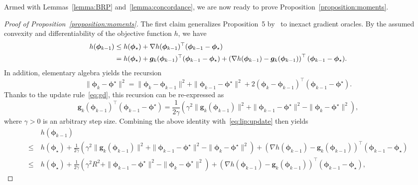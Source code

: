 \documentclass[11pt, a4paper, oneside, reqno]{article}
\begin{document}
	Armed with Lemmas~\ref{lemma:BRP} and~\ref{lemma:concordance}, we are now ready to prove Proposition~\ref{proposition:moments}.
	
	\begin{proof}[Proof of Proposition~\ref{proposition:moments}]
		The first claim generalizes Proposition~5 by~\citet{bach2013adaptivity} to inexact gradient oracles. 
		By the assumed convexity and differentiability of the objective function $h$, we have
		\begin{align} \label{eq:lip:update}
		h(\bm \phi_{k-1}) 
		&\leq h(\bm \phi_{\star}) + \nabla h(\bm \phi_{k-1})^\top (\bm \phi_{k-1} - \bm \phi_{\star}) \\
		&= h(\bm \phi_{\star}) + \bm g_k(\bm \phi_{k-1})^\top (\bm \phi_{k-1} - \bm \phi_{\star}) + \left( \nabla h(\bm \phi_{k-1}) - \bm g_k(\bm \phi_{k-1}) \right)^\top (\bm \phi_{k-1} - \bm \phi_{\star}). \notag
		\end{align}
		In addition, elementary algebra  yields the recursion
		\begin{equation*}
		\| \bm \phi_{k} - \bm \phi^\star \|^2 = \| \bm \phi_{k} - \bm \phi_{k-1} \|^2 + \| \bm \phi_{k-1} - \bm \phi^\star \|^2 + 2 (\bm \phi_{k} - \bm \phi_{k-1})^\top (\bm \phi_{k-1} - \bm \phi^\star).
		\end{equation*}
		Thanks to the update rule~\eqref{eq:gd}, this recursion can be re-expressed as
		\begin{equation*}
		\bm g_k(\bm \phi_{k-1})^\top (\bm \phi_{k-1} - \bm \phi^\star) = \frac{1}{2 \gamma} \left( \gamma^2 \| \bm g_k(\bm \phi_{k-1}) \|^2 + \| \bm \phi_{k-1} - \bm \phi^\star \|^2 - \| \bm \phi_{k} - \bm \phi^\star \|^2 \right),
		\end{equation*}
		where $\gamma > 0$ is an arbitrary step size. Combining the above identity with~\eqref{eq:lip:update} then yields
		\begin{align*}
		& ~h(\bm \phi_{k-1}) \\
		\leq & ~h(\bm \phi_{\star}) + \frac{1}{2 \gamma} \left( \gamma^2 \| \bm g_k(\bm \phi_{k-1}) \|^2 + \| \bm \phi_{k-1} - \bm \phi^\star \|^2 - \| \bm \phi_{k} - \bm \phi^\star \|^2 \right) + \left( \nabla h(\bm \phi_{k-1}) - \bm g_k(\bm \phi_{k-1}) \right)^\top \! (\bm \phi_{k-1} - \bm \phi_{\star}) \\
		\leq & ~h(\bm \phi_{\star}) + \frac{1}{2 \gamma} \left( \gamma^2 R^2 + \| \bm \phi_{k-1} - \bm \phi^\star \|^2 - \| \bm \phi_{k} - \bm \phi^\star \|^2 \right) + \left( \nabla h(\bm \phi_{k-1}) - \bm g_k(\bm \phi_{k-1}) \right)^\top (\bm \phi_{k-1} - \bm \phi_{\star}),

\end{align*}
\end{proof}
\end{document}
